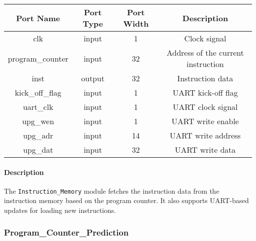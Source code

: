 \documentclass[a4paper,12pt]{article}
\begin{document}
\begin{center}
    \begin{tabular}{cccc}
        \toprule
        \textbf{Port Name} & \textbf{Port Type} & \textbf{Port Width} & \textbf{Description} \\
        \midrule
        clk                 & input  & 1  & Clock signal \\
        program\_counter    & input  & 32 & Address of the current instruction \\
        inst                & output & 32 & Instruction data \\
        kick\_off\_flag     & input  & 1  & UART kick-off flag \\
        uart\_clk           & input  & 1  & UART clock signal \\
        upg\_wen            & input  & 1  & UART write enable \\
        upg\_adr            & input  & 14 & UART write address \\
        upg\_dat            & input  & 32 & UART write data \\
        \bottomrule
    \end{tabular}
\end{center}

\paragraph{Description}
The \texttt{Instruction\_Memory} module fetches the instruction data from the instruction memory based on the program counter. It also supports UART-based updates for loading new instructions.

\subsubsection{Program\_Counter\_Prediction}
\end{document}
